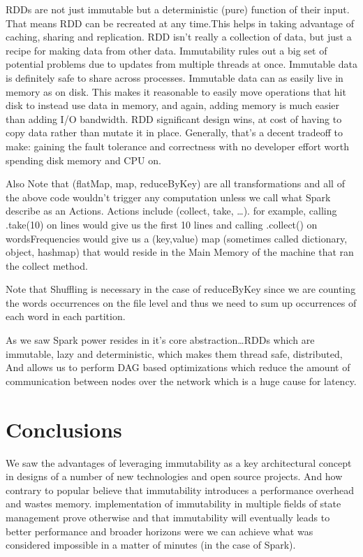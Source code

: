 \documentclass[12pt,twoside]{article}
\begin{document}
RDDs are not just immutable but a deterministic (pure) function of their input. That means RDD can be recreated at any time.This helps in taking advantage of caching, sharing and replication. RDD isn't really a collection of data, but just a recipe for making data from other data. Immutability rules out a big set of potential problems due to updates from multiple threads at once. Immutable data is definitely safe to share across processes. Immutable data can as easily live in memory as on disk. This makes it reasonable to easily move operations that hit disk to instead use data in memory, and again, adding memory is much easier than adding I/O bandwidth. RDD significant design wins, at cost of having to copy data rather than mutate it in place. Generally, that's a decent tradeoff to make: gaining the fault tolerance and correctness with no developer effort worth spending disk memory and CPU on.

Also Note that (flatMap, map, reduceByKey) are all transformations and all of the above code wouldn't trigger any computation unless we call what Spark describe as an Actions.\newline
Actions include (collect, take, \dots). for example, calling .take(10) on lines would give us the first 10 lines and calling .collect() on wordsFrequencies would give us a (key,value) map (sometimes called dictionary, object, hashmap) that would reside in the Main Memory of the machine that ran the collect method.

Note that Shuffling is necessary in the case of reduceByKey since we are counting the words occurrences on the file level and thus we need to sum up occurrences of each word in each partition.

As we saw Spark power resides in it's core abstraction\dots RDDs which are immutable, lazy and deterministic, which makes them thread safe, distributed, And allows us to perform DAG based optimizations which reduce the amount of communication between nodes over the network which is a huge cause for latency.


\section{Conclusions}
We saw the advantages of leveraging immutability as a key architectural concept in designs of a number of new technologies and open source projects. And how contrary to popular believe that immutability introduces a performance overhead and wastes memory. implementation of immutability in multiple fields of state management prove otherwise and that immutability will eventually leads to better performance and broader horizons were we can achieve what was considered impossible in a matter of minutes (in the case of Spark).
\end{document}
